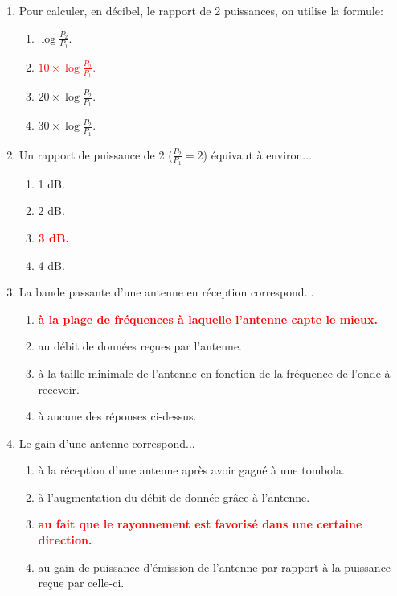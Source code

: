 \documentclass[a4paper]{article}
\begin{document}
\begin{enumerate}[label=Q\arabic*.]


\item Pour calculer, en décibel, le rapport de 2 puissances, on utilise la formule:
\begin{enumerate}
    \item $\displaystyle \log \frac{P_2}{P_1} $.
    \item \textcolor{red}{\textbf{$\displaystyle 10 \times \log \frac{P_2}{P_1} $}.}
    \item $\displaystyle 20 \times \log \frac{P_2}{P_1} $.
    \item $\displaystyle 30 \times \log \frac{P_2}{P_1} $.
\end{enumerate}


\item Un rapport de puissance de 2 \bigg($\displaystyle \frac{P_2}{P_1} = 2 $\bigg) équivaut à environ...
\begin{enumerate}
    \item 1 dB.
    \item 2 dB.
    \item \textcolor{red}{\textbf{3 dB.}}
    \item 4 dB.
\end{enumerate}


\item La bande passante d'une antenne en réception correspond...
\begin{enumerate}
    \item \textcolor{red}{\textbf{à la plage de fréquences à laquelle l'antenne capte le mieux.}}
    \item au débit de données reçues par l'antenne.
    \item à la taille minimale de l'antenne en fonction de la fréquence de l'onde à recevoir.
    \item à aucune des réponses ci-dessus.
\end{enumerate}


\item  Le gain d'une antenne correspond...
\begin{enumerate}
    \item à la réception d'une antenne après avoir gagné à une tombola.
    \item à l'augmentation du débit de donnée grâce à l'antenne.
    \item \textcolor{red}{\textbf{au fait que le rayonnement est favorisé dans une certaine direction.}}
    \item au gain de puissance d'émission de l'antenne par rapport à la puissance reçue par celle-ci.
\end{enumerate}



\end{enumerate}
\end{document}
